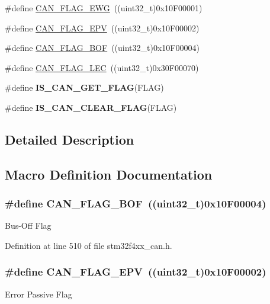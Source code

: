 \begin{DoxyCompactItemize}
\item 
\#define \hyperlink{group___c_a_n__flags_gae8906ba9c4031866c5096418ffa9bf71}{C\-A\-N\-\_\-\-F\-L\-A\-G\-\_\-\-E\-W\-G}~((uint32\-\_\-t)0x10\-F00001)
\item 
\#define \hyperlink{group___c_a_n__flags_ga61954e54995f638ed78281ad2b0cf43a}{C\-A\-N\-\_\-\-F\-L\-A\-G\-\_\-\-E\-P\-V}~((uint32\-\_\-t)0x10\-F00002)
\item 
\#define \hyperlink{group___c_a_n__flags_ga65f20612d0bf1692003882c0cdbadb1c}{C\-A\-N\-\_\-\-F\-L\-A\-G\-\_\-\-B\-O\-F}~((uint32\-\_\-t)0x10\-F00004)
\item 
\#define \hyperlink{group___c_a_n__flags_ga73a774fa4d391aec0ea6552bf9372917}{C\-A\-N\-\_\-\-F\-L\-A\-G\-\_\-\-L\-E\-C}~((uint32\-\_\-t)0x30\-F00070)
\item 
\#define {\bfseries I\-S\-\_\-\-C\-A\-N\-\_\-\-G\-E\-T\-\_\-\-F\-L\-A\-G}(F\-L\-A\-G)
\item 
\#define {\bfseries I\-S\-\_\-\-C\-A\-N\-\_\-\-C\-L\-E\-A\-R\-\_\-\-F\-L\-A\-G}(F\-L\-A\-G)
\end{DoxyCompactItemize}


\subsection{Detailed Description}


\subsection{Macro Definition Documentation}
\hypertarget{group___c_a_n__flags_ga65f20612d0bf1692003882c0cdbadb1c}{
\subsubsection[{C\-A\-N\-\_\-\-F\-L\-A\-G\-\_\-\-B\-O\-F}]{\setlength{\rightskip}{0pt plus 5cm}\#define C\-A\-N\-\_\-\-F\-L\-A\-G\-\_\-\-B\-O\-F~((uint32\-\_\-t)0x10\-F00004)}}\label{group___c_a_n__flags_ga65f20612d0bf1692003882c0cdbadb1c}
Bus-\/\-Off Flag 

Definition at line 510 of file stm32f4xx\-\_\-can.\-h.

\hypertarget{group___c_a_n__flags_ga61954e54995f638ed78281ad2b0cf43a}{
\subsubsection[{C\-A\-N\-\_\-\-F\-L\-A\-G\-\_\-\-E\-P\-V}]{\setlength{\rightskip}{0pt plus 5cm}\#define C\-A\-N\-\_\-\-F\-L\-A\-G\-\_\-\-E\-P\-V~((uint32\-\_\-t)0x10\-F00002)}}\label{group___c_a_n__flags_ga61954e54995f638ed78281ad2b0cf43a}
Error Passive Flag 

